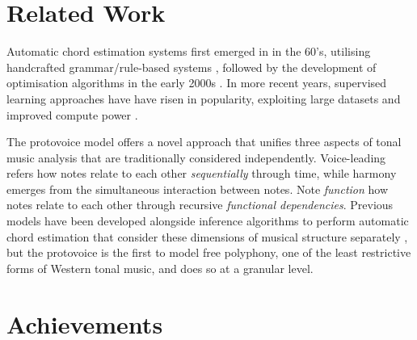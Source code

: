 \documentclass[12pt,a4paper,twoside,openright]{report}
\theoremstyle{definition}
\begin{document}
\section{Related Work}

Automatic chord estimation systems first emerged in in the 60's, utilising handcrafted grammar/rule-based systems \cite{maxwellExpertSystemHarmonizing1992} \cite{winogradLinguisticsComputerAnalysis1968}, followed by the development of optimisation algorithms in the early 2000s \cite{pardoAlgorithmsChordalAnalysis2002}. In more recent years, supervised learning approaches have have risen in popularity, exploiting large datasets and improved compute power \cite{niEndtoendMachineLearning2011} \cite{mcleodModularSystemHarmonic2021} \cite{masadaChordRecognitionSymbolic2018}. 
\par 
The protovoice model offers a novel approach that unifies three aspects of tonal music analysis that are traditionally considered independently. Voice-leading refers how notes relate to each other \textit{sequentially} through time, while harmony emerges from the simultaneous interaction between notes. Note \textit{function} how notes relate to each other through recursive \textit{functional dependencies}. Previous models have been developed alongside inference algorithms to perform automatic chord estimation that consider these dimensions of musical structure separately \cite{maxwellExpertSystemHarmonizing1995} \cite{winogradLinguisticsComputerAnalysis1968}, but the protovoice is the first to model free polyphony, one of the least restrictive forms of Western tonal music, and does so at a granular level. 


\par

\section{Achievements}
\end{document}
